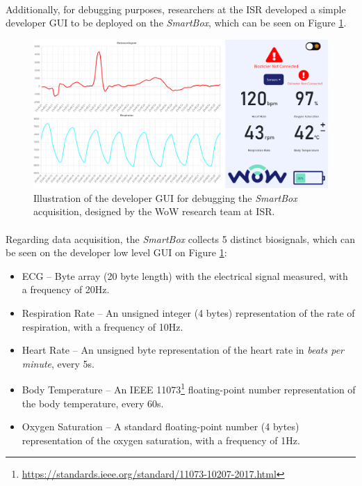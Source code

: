 \paragraph{} Additionally, for debugging purposes, researchers at the \acs{ISR} developed a simple developer \acs{GUI} to be deployed on the \textit{SmartBox}, which can be seen on Figure \ref{fig:smartbox-gui}.

\begin{figure}[H]
    \centering
    \includegraphics[width=\linewidth]{images/smartbox-gui.png}
    \caption{Illustration of the developer \acf{GUI} for debugging the \textit{SmartBox} acquisition, designed by the \acs{WoW} research team at \acs{ISR}.}
    \label{fig:smartbox-gui}
\end{figure}

\paragraph{} Regarding data acquisition, the \textit{SmartBox} collects 5 distinct biosignals, which can be seen on the developer low level \acs{GUI} on Figure \ref{fig:smartbox-gui}:

\begin{itemize}
    \item \acf{ECG} -- Byte array (20 byte length) with the electrical signal measured, with a frequency of 20Hz.
    \item Respiration Rate -- An unsigned integer (4 bytes) representation of the rate of respiration, with a frequency of 10Hz.
    \item Heart Rate -- An unsigned byte representation of the heart rate in \textit{beats per minute}, every 5s.
    \item Body Temperature -- An IEEE 11073\footnote{\url{https://standards.ieee.org/standard/11073-10207-2017.html}} floating-point number representation of the body temperature, every 60s.
    \item Oxygen Saturation -- A standard floating-point number (4 bytes) representation of the oxygen saturation, with a frequency of 1Hz.
\end{itemize}


